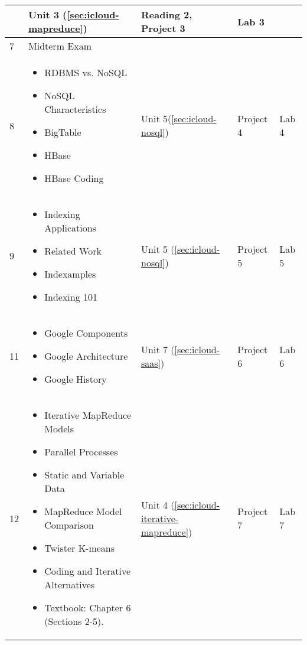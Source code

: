 \begin{center}
\begin{longtable}{|l|p{7cm}|p{1.5cm}|p{1.5cm}|p{1.5cm}|}
\begin{itemize}[leftmargin=*]
    \end{itemize}
    & Unit 3 (\ref{sec:icloud-mapreduce}) & Reading 2, Project 3 & Lab 3 \\
    \hline
     7 &
    Midterm Exam & ~ & ~ & ~ \\
    \hline
     8 &
    \begin{itemize}[leftmargin=*]
      \item RDBMS vs. NoSQL
      \item NoSQL Characteristics
      \item BigTable
      \item HBase
      \item HBase Coding
    \end{itemize}
    & Unit 5(\ref{sec:icloud-nosql}) &	Project 4 & Lab 4 \\
    \hline
     9 &
    \begin{itemize}[leftmargin=*]
      \item Indexing Applications
      \item Related Work
      \item Indexamples
      \item Indexing 101
    \end{itemize}
    & Unit 5 (\ref{sec:icloud-nosql}) &	Project 5 & Lab 5 \\
    \hline
     11 &
    \begin{itemize}[leftmargin=*]
      \item Google Components
      \item Google Architecture
      \item Google History
    \end{itemize}
    & Unit 7 (\ref{sec:icloud-saas}) &	Project 6 &	Lab 6 \\
    \hline
     12 &
    \begin{itemize}[leftmargin=*]
      \item Iterative MapReduce Models
      \item Parallel Processes
      \item Static and Variable Data
      \item MapReduce Model Comparison
      \item Twister K-means
      \item Coding and Iterative Alternatives
      \item Textbook: Chapter 6 (Sections 2-5).
    \end{itemize}
    & Unit 4 (\ref{sec:icloud-iterative-mapreduce}) &	Project 7 &	Lab 7 \\

\end{longtable}
\end{center}
